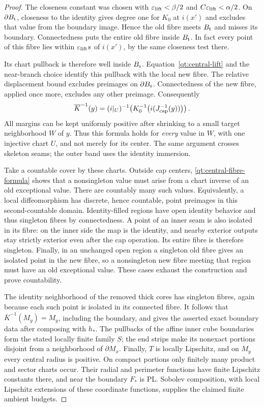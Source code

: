 \begin{proof}
The closeness constant was chosen with
$\varepsilon_{\rm lift}<\beta/2$ and
$C\varepsilon_{\rm lift}<\alpha/2$.  On $\partial B_{\rm t}$,
closeness to the identity gives degree one for $K_0$ at $i(x')$
and excludes that value from the boundary image.  Hence the old
fibre meets $B_{\rm t}$ and misses its boundary.  Connectedness
puts the entire old fibre inside $B_{\rm t}$.  In fact every point
of this fibre lies within
$\varepsilon_{\rm lift}s$ of $i(x')$, by the same closeness test there.

Its chart pullback is therefore well inside $B_{\rm s}$.
Equation~\eqref{qt:central-lift} and the near-branch choice identify
this pullback with the local new fibre.  The relative displacement
bound excludes preimages on $\partial B_{\rm s}$.  Connectedness
of the new fibre, applied once more, excludes any other preimage.
Consequently
\begin{equation}\label{qt:central-fibre-formula}
 \overline K^{-1}(y)
   =(i|_U)^{-1}\!\left(K_0^{-1}
          \bigl(i(J_{\rm cap}^{-1}(y))\bigr)\right).
\end{equation}
All margins can be kept uniformly positive after shrinking to a
small target neighborhood $W$ of $y$.  Thus this formula holds for
\emph{every} value in $W$, with one injective chart $U$, and not
merely for its center.  The same argument crosses skeleton seams;
the outer band uses the identity immersion.

Take a countable cover by these charts.  Outside cap centers,
\eqref{qt:central-fibre-formula} shows that a nonsingleton value
must arise from a chart inverse of an old exceptional value.  There
are countably many such values.  Equivalently, a local diffeomorphism
has discrete, hence countable, point preimages in this second-countable
domain.  Identity-filled regions have open identity behavior and
thus singleton fibres by connectedness.  A point of an inner seam
is also isolated in its fibre: on the inner side the map is the
identity, and nearby exterior outputs stay strictly exterior even
after the cap operation.  Its entire fibre is therefore singleton.
Finally, in an unchanged open region a singleton old fibre gives
an isolated point in the new fibre, so a nonsingleton new fibre
meeting that region must have an old exceptional value.  These
cases exhaust the construction and prove countability.

The identity neighborhood of the removed thick cores has singleton
fibres, again because each such point is isolated in its connected
fibre.  It follows that $\overline K^{-1}(M_y)=M_y$, including the
boundary, and gives the asserted exact boundary data after composing
with $h_*$.  The pullbacks of the affine inner cube boundaries form
the stated locally finite family $S$; the end strips make its
nonexact portions disjoint from a neighborhood of $\partial M_x$.
Finally, $T$ is locally Lipschitz, and on $M_y$ every central radius
is positive.  On compact portions only finitely many product and
sector charts occur.  Their radial and perimeter functions have
finite Lipschitz constants there, and near the boundary $F_*$ is
PL.  Sobolev composition, with local Lipschitz extensions of these
coordinate functions, supplies the claimed finite ambient budgets.
\end{proof}


